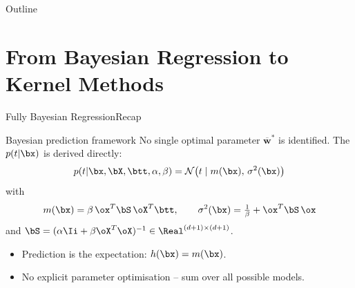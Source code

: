 %

%

\begin{frame}[plain]
  \titlepage
\end{frame}

\begin{frame}{Outline}
  \tableofcontents
\end{frame}

\section{From Bayesian Regression to Kernel Methods}

\begin{frame}{Fully Bayesian Regression}{Recap}
  \begin{block}{Bayesian prediction framework}
    No single optimal parameter $\overline{\mathbf{w}}^*$ is identified.
    The  $p(t|\bx)$ is derived directly:
    \[
      p(t|\bx,\bX,\btt,\alpha,\beta)=\mathcal{N}\!\left(t\mid m(\bx),\,\sigma^2(\bx)\right)
    \]
    with
    \[
      m(\bx)=\beta\,\ox^T\bS\,\oX^T\btt,\qquad
      \sigma^2(\bx)=\tfrac{1}{\beta}+\ox^T\bS\,\ox
    \]
    and $\bS=(\alpha\Ii+\beta\oX^T\oX)^{-1}\in\Real^{(d+1)\times(d+1)}$.
  \end{block}

  \medskip
  \begin{itemize}
    \item Prediction is the expectation: $h(\bx)=m(\bx)$.
    \item No explicit parameter optimisation -- sum over all possible models.
  \end{itemize}
\end{frame}

